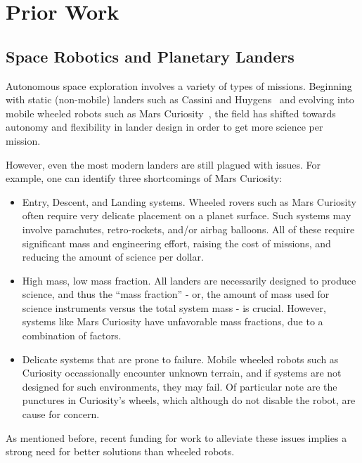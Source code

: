 \documentclass[12pt]{report}
\begin{document}
\section{Prior Work}

\subsection{Space Robotics and Planetary Landers}

Autonomous space exploration involves a variety of types of missions.
Beginning with static (non-mobile) landers such as Cassini and Huygens~\cite{matson2003cassini} and evolving into mobile wheeled robots such as Mars Curiosity~\cite{grotzinger2012mars}, the field has shifted towards autonomy and flexibility in lander design in order to get more science per mission.

However, even the most modern landers are still plagued with issues.
For example, one can identify three shortcomings of Mars Curiosity:

\begin{itemize}
  \setlength{\itemsep}{0cm}%
  \setlength{\parskip}{0cm}%
  \item Entry, Descent, and Landing systems. Wheeled rovers such as Mars Curiosity often require very delicate placement on a planet surface. Such systems may involve parachutes, retro-rockets, and/or airbag balloons. All of these require significant mass and engineering effort, raising the cost of missions, and reducing the amount of science per dollar.~\cite{Vytas_IPPW_2013,NIACfinalreport}
  \item High mass, low mass fraction. All landers are necessarily designed to produce science, and thus the ``mass fraction'' - or, the amount of mass used for science instruments versus the total system mass - is crucial. However, systems like Mars Curiosity have unfavorable mass fractions, due to a combination of factors.~\cite{Vytas_IPPW_2013,NIACfinalreport}
  \item Delicate systems that are prone to failure. Mobile wheeled robots such as Curiosity occassionally encounter unknown terrain, and if systems are not designed for such environments, they may fail. Of particular note are the punctures in Curiosity's wheels, which although do not disable the robot, are cause for concern.~\cite{Vytas_IPPW_2013,NIACfinalreport}
\end{itemize}

As mentioned before, recent funding for work to alleviate these issues implies a strong need for better solutions than wheeled robots.
\end{document}
